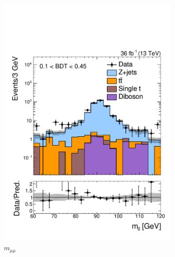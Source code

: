 \begin{figure}[]
\begin{center}
\begin{subfigure}[t]{0.49\textwidth}
            \includegraphics[width=\textwidth]{figures/monotop/prefit/dimuon_loose_diLepMass_logy.pdf}
            \caption{$m_{\mu\mu}$}
        \end{subfigure}
        \begin{subfigure}[t]{0.49\textwidth}

\end{subfigure}
\end{center}
\end{figure}
